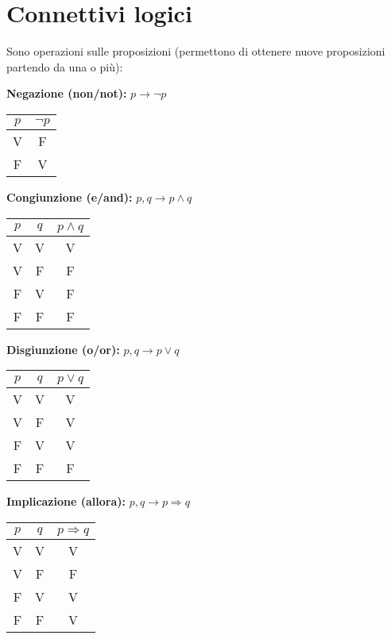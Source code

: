 \documentclass[10pt, oneside]{book}
\theoremstyle{plain}
\begin{document}
\section{Connettivi logici}
Sono operazioni sulle proposizioni (permettono di ottenere nuove proposizioni partendo da una o più):
\begin{description}
   \item[$\ast$] \textbf{Negazione (non/not):} $p \longrightarrow \neg p$ 
   \item \begin{center} \begin{tabular}{c|c}
        $p$ & $\neg p$  \\
        \hline  V  & F \\ F & V
       \end{tabular} \end{center}
     \item[$\ast$] \textbf{Congiunzione (e/and):} $p, q \longrightarrow p \land q$
   \item \begin{center} \begin{tabular}{c|c|c}
        $p$ & $q$ & $p \land q$  \\
        \hline  V  & V & V \\ V & F & F \\ F & V & F \\ F & F & F 
       \end{tabular}
       \end{center}
 \item[$\ast$] \textbf{Disgiunzione (o/or):} $p, q \longrightarrow p \lor q$
   \item \begin{center} \begin{tabular}{c|c|c}
        $p$ & $q$ & $p \lor q$  \\
        \hline  V  & V & V \\ V & F & V \\ F & V & V \\ F & F & F
       \end{tabular}  \end{center}
 \item[$\ast$] \textbf{Implicazione (allora):} $p, q \longrightarrow p \Rightarrow q$
   \item \begin{center} \begin{tabular}{c|c|c}
        $p$ & $q$ & $p \Rightarrow q$  \\
        \hline  V  & V & V \\ V & F & F \\ F & V & V \\ F & F & V

\end{tabular}
\end{center}
\end{description}
\end{document}
